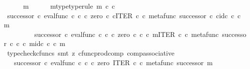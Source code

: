 \begin{isabellebody}
\ \ \ \ \isamarkupfalse%
\ m\isanewline
\ \ \ \ \isamarkupfalse%
\ m{\isacharunderscore}{\kern0pt}type{\isacharbrackleft}{\kern0pt}type{\isacharunderscore}{\kern0pt}rule{\isacharbrackright}{\kern0pt}{\isacharcolon}{\kern0pt}\ {\isachardoublequoteopen}m\ {\isasymin}\isactrlsub c\ {\isasymnat}\isactrlsub c{\isachardoublequoteclose}\isanewline
\ \ \ \ \isamarkupfalse%
\ {\isachardoublequoteopen}{\isacharparenleft}{\kern0pt}successor\ {\isasymcirc}\isactrlsub c\ eval{\isacharunderscore}{\kern0pt}func\ {\isasymnat}\isactrlsub c\ {\isasymnat}\isactrlsub c\ {\isasymcirc}\isactrlsub c\ {\isasymlangle}zero\ {\isasymcirc}\isactrlsub c\ {\isasymbeta}\isactrlbsub {\isasymnat}\isactrlsub c\isactrlesub {\isacharcomma}{\kern0pt}ITER\ {\isasymnat}\isactrlsub c\ {\isasymcirc}\isactrlsub c\ {\isasymlangle}metafunc\ successor\ {\isasymcirc}\isactrlsub c\ {\isasymbeta}\isactrlbsub {\isasymnat}\isactrlsub c\isactrlesub {\isacharcomma}{\kern0pt}id\isactrlsub c\ {\isasymnat}\isactrlsub c{\isasymrangle}{\isasymrangle}{\isacharparenright}{\kern0pt}\ {\isasymcirc}\isactrlsub c\ m\ {\isacharequal}{\kern0pt}\ \isanewline
\ \ \ \ \ \ \ \ \ successor\ {\isasymcirc}\isactrlsub c\ eval{\isacharunderscore}{\kern0pt}func\ {\isasymnat}\isactrlsub c\ {\isasymnat}\isactrlsub c\ {\isasymcirc}\isactrlsub c\ {\isasymlangle}zero\ {\isasymcirc}\isactrlsub c\ {\isasymbeta}\isactrlbsub {\isasymnat}\isactrlsub c\isactrlesub \ {\isasymcirc}\isactrlsub c\ m{\isacharcomma}{\kern0pt}ITER\ {\isasymnat}\isactrlsub c\ {\isasymcirc}\isactrlsub c\ {\isasymlangle}metafunc\ successor\ {\isasymcirc}\isactrlsub c\ {\isasymbeta}\isactrlbsub {\isasymnat}\isactrlsub c\isactrlesub \ {\isasymcirc}\isactrlsub c\ m{\isacharcomma}{\kern0pt}id\isactrlsub c\ {\isasymnat}\isactrlsub c\ {\isasymcirc}\isactrlsub c\ m{\isasymrangle}{\isasymrangle}{\isachardoublequoteclose}\isanewline
\ \ \ \ \ \ \isamarkupfalse%
\ {\isacharparenleft}{\kern0pt}typecheck{\isacharunderscore}{\kern0pt}cfuncs{\isacharcomma}{\kern0pt}\ smt\ {\isacharparenleft}{\kern0pt}z{}{\isacharparenright}{\kern0pt}\ cfunc{\isacharunderscore}{\kern0pt}prod{\isacharunderscore}{\kern0pt}comp\ comp{\isacharunderscore}{\kern0pt}associative{}{\isacharparenright}{\kern0pt}\isanewline
\ \ \ \ \isamarkupfalse%
\ \isamarkupfalse%
\ {\isachardoublequoteopen}{\isachardot}{\kern0pt}{\isachardot}{\kern0pt}{\isachardot}{\kern0pt}\ {\isacharequal}{\kern0pt}\ successor\ {\isasymcirc}\isactrlsub c\ eval{\isacharunderscore}{\kern0pt}func\ {\isasymnat}\isactrlsub c\ {\isasymnat}\isactrlsub c\ {\isasymcirc}\isactrlsub c\ {\isasymlangle}zero\ {\isacharcomma}{\kern0pt}ITER\ {\isasymnat}\isactrlsub c\ {\isasymcirc}\isactrlsub c\ {\isasymlangle}metafunc\ successor\ {\isacharcomma}{\kern0pt}m{\isasymrangle}{\isasymrangle}{\isachardoublequoteclose}\isanewline

\end{isabellebody}
